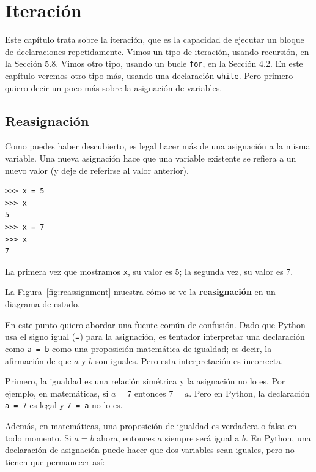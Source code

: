 \chapter{Iteración}

Este capítulo trata sobre la iteración, que es la capacidad de ejecutar un bloque de declaraciones repetidamente. Vimos un tipo de iteración, usando recursión, en la Sección 5.8. Vimos otro tipo, usando un bucle \texttt{for}, en la Sección 4.2. En este capítulo veremos otro tipo más, usando una declaración \texttt{while}. Pero primero quiero decir un poco más sobre la asignación de variables.

\section{Reasignación}

Como puedes haber descubierto, es legal hacer más de una asignación a la misma variable. Una nueva asignación hace que una variable existente se refiera a un nuevo valor (y deje de referirse al valor anterior).

\begin{lstlisting}
>>> x = 5
>>> x
5
>>> x = 7
>>> x
7
\end{lstlisting}

La primera vez que mostramos \texttt{x}, su valor es 5; la segunda vez, su valor es 7.

La Figura~\ref{fig:reassignment} muestra cómo se ve la \textbf{reasignación} en un diagrama de estado.


En este punto quiero abordar una fuente común de confusión. Dado que Python usa el signo igual (\texttt{=}) para la asignación, es tentador interpretar una declaración como \texttt{a = b} como una proposición matemática de igualdad; es decir, la afirmación de que $a$ y $b$ son iguales. Pero esta interpretación es incorrecta.

Primero, la igualdad es una relación simétrica y la asignación no lo es. Por ejemplo, en matemáticas, si $a = 7$ entonces $7 = a$. Pero en Python, la declaración \texttt{a = 7} es legal y \texttt{7 = a} no lo es.

Además, en matemáticas, una proposición de igualdad es verdadera o falsa en todo momento. Si $a = b$ ahora, entonces $a$ siempre será igual a $b$. En Python, una declaración de asignación puede hacer que dos variables sean iguales, pero no tienen que permanecer así:

